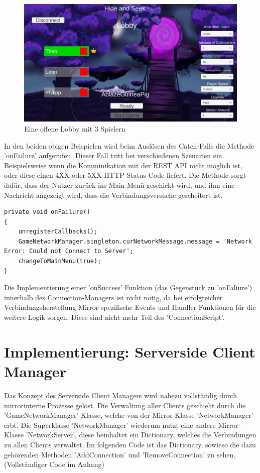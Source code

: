 \begin{figure}[H]
	\centering
	\includegraphics[width=120mm]{images/prototyp_lobby_menu.png}
	\caption[Prototyp Lobby Menu]{Eine offene Lobby mit 3 Spielern}
	\label{pic:prototyp_lobby_menu}
\end{figure}

In den beiden obigen Beispielen wird beim Auslösen des Catch-Falls die Methode 'onFailure' aufgerufen. Dieser Fall tritt bei verschiedenen Szenarien ein. Beispielsweise wenn die Komminikation mit der REST API nicht möglich ist, oder diese einen 4XX oder 5XX HTTP-Status-Code liefert. Die Methode sorgt dafür, dass der Nutzer zurück ins Main-Menü geschickt wird, und ihm eine Nachricht angezeigt wird, dass die Verbindungsversuche gescheitert ist.

\begin{lstlisting}[caption= ConnectionScript.cs onFailure()]
private void onFailure()
{
	unregisterCallbacks();
	GameNetworkManager.singleton.curNetworkMessage.message = 'Network Error: Could not Connect to Server';
	changeToMainMenu(true);
}

\end{lstlisting}

Die Implementierung einer 'onSuccess' Funktion (das Gegenstück zu 'onFaliure') innerhalb des Connection-Managers ist nicht nötig, da bei erfolgreicher Verbindungsherstellung Mirror-spezifische Events und Handler-Funktionen für die weitere Logik sorgen. Diese sind nicht mehr Teil des 'ConnectionScript'.

\section{Implementierung: Serverside Client Manager}

Das Konzept des Serverside Client Managers wird nahezu vollständig durch mirrorinterne Prozesse gelöst. Die Verwaltung aller Clients geschieht durch die 'GameNetworkManager' Klasse, welche von der Mirror Klasse 'NetworkManager' erbt. Die Superklasse 'NetworkManager' wiederum nutzt eine andere Mirror-Klasse 'NetworkServer', diese beinhaltet ein Dictionary, welches die Verbindungen zu allen Clients verwaltet. Im folgenden Code ist das Dictionary, sowieso die dazu gehörenden Methoden 'AddConnection' und 'RemoveConnection' zu sehen. (Vollständiger Code im Anhang)

